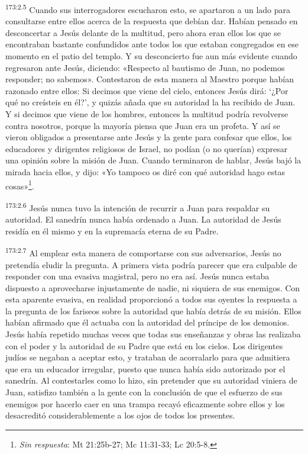 \par 
\textsuperscript{173:2.5} Cuando sus interrogadores escucharon esto, se apartaron a un lado para consultarse entre ellos acerca de la respuesta que debían dar. Habían pensado en desconcertar a Jesús delante de la multitud, pero ahora eran ellos los que se encontraban bastante confundidos ante todos los que estaban congregados en ese momento en el patio del templo. Y su desconcierto fue aun más evidente cuando regresaron ante Jesús, diciendo: «Respecto al bautismo de Juan, no podemos responder; no sabemos». Contestaron de esta manera al Maestro porque habían razonado entre ellos: Si decimos que viene del cielo, entonces Jesús dirá: `¿Por qué no creísteis en él?', y quizás añada que su autoridad la ha recibido de Juan. Y si decimos que viene de los hombres, entonces la multitud podría revolverse contra nosotros, porque la mayoría piensa que Juan era un profeta. Y así se vieron obligados a presentarse ante Jesús y la gente para confesar que ellos, los educadores y dirigentes religiosos de Israel, no podían (o no querían) expresar una opinión sobre la misión de Juan. Cuando terminaron de hablar, Jesús bajó la mirada hacia ellos, y dijo: «Yo tampoco os diré con qué autoridad hago estas cosas»\footnote{\textit{Sin respuesta}: Mt 21:25b-27; Mc 11:31-33; Lc 20:5-8.}.

\par 
\textsuperscript{173:2.6} Jesús nunca tuvo la intención de recurrir a Juan para respaldar su autoridad. El sanedrín nunca había ordenado a Juan. La autoridad de Jesús residía en él mismo y en la supremacía eterna de su Padre.

\par 
\textsuperscript{173:2.7} Al emplear esta manera de comportarse con sus adversarios, Jesús no pretendía eludir la pregunta. A primera vista podría parecer que era culpable de responder con una evasiva magistral, pero no era así. Jesús nunca estaba dispuesto a aprovecharse injustamente de nadie, ni siquiera de sus enemigos. Con esta aparente evasiva, en realidad proporcionó a todos sus oyentes la respuesta a la pregunta de los fariseos sobre la autoridad que había detrás de su misión. Ellos habían afirmado que él actuaba con la autoridad del príncipe de los demonios. Jesús había repetido muchas veces que todas sus enseñanzas y obras las realizaba con el poder y la autoridad de su Padre que está en los cielos. Los dirigentes judíos se negaban a aceptar esto, y trataban de acorralarlo para que admitiera que era un educador irregular, puesto que nunca había sido autorizado por el sanedrín. Al contestarles como lo hizo, sin pretender que su autoridad viniera de Juan, satisfizo también a la gente con la conclusión de que el esfuerzo de sus enemigos por hacerlo caer en una trampa recayó eficazmente sobre ellos y los desacreditó considerablemente a los ojos de todos los presentes.

